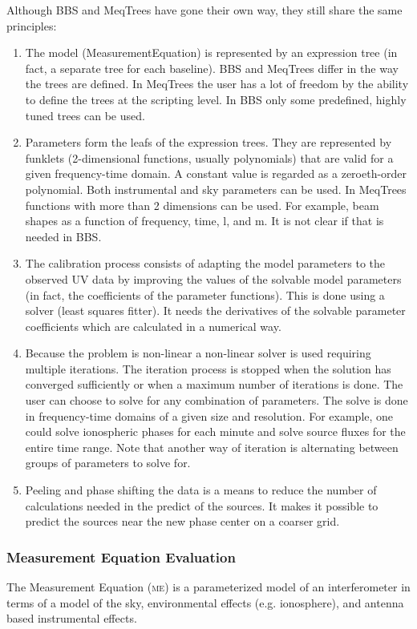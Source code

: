 \documentclass[10pt]{lofar}
\newcommand{\me}{\textsc{me}\xspace}
\begin{document}
Although BBS and MeqTrees have gone their own way, they still share the same
principles:
\begin{enumerate}
\item The model (MeasurementEquation) is represented by an expression tree (in
fact, a separate tree for each baseline). BBS and MeqTrees differ in the way
the trees are defined. In MeqTrees the user has a lot of freedom by the
ability to define the trees at the scripting level. In BBS only some
predefined, highly tuned trees can be used.
\item Parameters form the leafs of the expression trees. They are represented by
funklets (2-dimensional functions, usually polynomials) that are valid for a
given frequency-time domain. A constant value is regarded as a zeroeth-order
polynomial. Both instrumental and sky parameters can be used.  In MeqTrees
functions with more than 2 dimensions can be used. For example, beam shapes as
a function of frequency, time, l, and m. It is not clear if that is needed in
BBS.
\item The calibration process consists of adapting the model parameters to the
observed UV data by improving the values of the solvable model parameters (in
fact, the coefficients of the parameter functions). This is done using a
solver (least squares fitter). It needs the derivatives of the solvable
parameter coefficients which are calculated in a numerical way.
\item Because the problem is non-linear a non-linear solver is used requiring
multiple iterations. The iteration process is stopped when the solution has
converged sufficiently or when a maximum number of iterations is done.  The
user can choose to solve for any combination of parameters. The solve is done
in frequency-time domains of a given size and resolution. For example, one
could solve ionospheric phases for each minute and solve source fluxes for the
entire time range.  Note that another way of iteration is alternating between
groups of parameters to solve for.
\item Peeling and phase shifting the data is a means to reduce the number of
calculations needed in the predict of the sources. It makes it possible to
predict the sources near the new phase center on a coarser grid.
\end{enumerate}

\subsubsection{Measurement Equation Evaluation}
\label{subsubsec:design-me-evaluation}
The Measurement Equation (\me) \cite{LOFAR-ASTRON-ADD-015} is a parameterized model of an interferometer in terms of a model of the sky, environmental effects (e.g. ionosphere), and antenna based instrumental effects.
\end{document}
